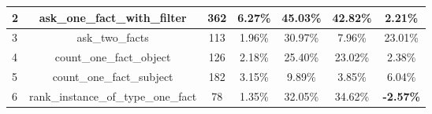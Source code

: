 \begin{table}[h!]
{\begin{tabular}{|l|c|cc|cc|c|}
    2                            & ask\_one\_fact\_with\_filter                                                                                           & 362                                                 & 6.27\%                                                                          & 45.03\%                                                                                                & 42.82\%                                                                                & 2.21\%                                  \\ \hline
    3                            & ask\_two\_facts                                                                                                        & 113                                                 & 1.96\%                                                                          & 30.97\%                                                                                                & 7.96\%                                                                                 & 23.01\%                                 \\ \hline
    4                            & count\_one\_fact\_object                                                                                               & 126                                                 & 2.18\%                                                                          & 25.40\%                                                                                                & 23.02\%                                                                                & 2.38\%                                  \\ \hline
    5                            & count\_one\_fact\_subject                                                                                              & 182                                                 & 3.15\%                                                                          & 9.89\%                                                                                                 & 3.85\%                                                                                 & 6.04\%                                  \\ \hline
    6                            & rank\_instance\_of\_type\_one\_fact                                                                                    & 78                                                  & 1.35\%                                                                          & 32.05\%                                                                                                & 34.62\%                                                                                & \textbf{-2.57\%}                        \\ \hline

\end{tabular}}
\end{table}
